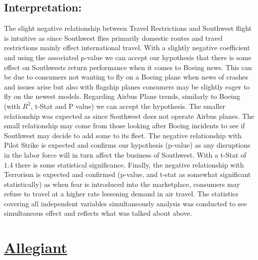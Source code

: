 \documentclass[12pt]{report}
\begin{document}
\subsection*{Interpretation:}
The slight negative relationship between Travel Restrictions and Southwest flight is intuitive as since Southwest flies primarily domestic routes and travel restrictions mainly effect international travel.
With a slightly negative coefficient and using the associated p-value we can accept our hypothesis that there is some effect on Southwests return performance when it comes to Boeing news.
This can be due to consumers not wanting to fly on a Boeing plane when news of crashes and issues arise but also with flagship planes consumers may be slightly eager to fly on the newest models.
Regarding Airbus Plane trends, similarly to Boeing (with $R^2$, t-Stat and P value) we can accept the hypothesis. The smaller relationship was expected as since Southwest does not operate Airbus planes.
The small relationship may come from those looking after Boeing incidents to see if Southwest may decide to add some to its fleet.
The negative relationship with Pilot Strike is expected and confirms our hypothesis (p-value) as any disruptions in the labor force will in turn affect the business of Southwest. With a t-Stat of $1.4$ there is some statistical significance.
Finally, the negative relationship with Terrorism is expected and confirmed (p-value, and t-stat as somewhat significant statistically) as when fear is introduced into the marketplace, consumers may refuse to travel at a higher rate lessening demand in air travel.
The statistics covering all independent variables simultaneously analysis was conducted to see simultaneous effect and reflects what was talked about above.

\newpage
\section*{\underline{Allegiant}}
\end{document}
